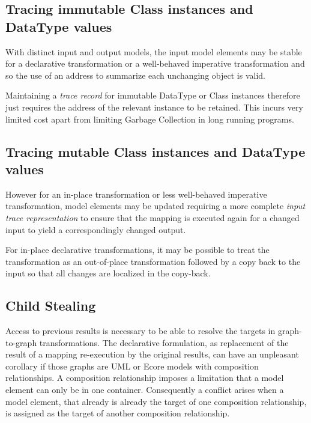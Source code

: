 \documentclass[runningheads,a4paper]{llncs}
\begin{document}
\subsection{Tracing immutable Class instances and DataType values}

With distinct input and output models, the input model elements may be stable for a declarative transformation or a well-behaved imperative transformation and so the use of an address to summarize each unchanging object is valid.

Maintaining a \emph{trace record} for immutable DataType or Class instances therefore just requires the address of the relevant instance to be retained. This incurs very limited cost apart from limiting Garbage Collection in long running programs.


\subsection{Tracing mutable Class instances and DataType values}

However for an in-place transformation or less well-behaved imperative transformation, model elements may be updated requiring a more complete \emph{input trace representation} to ensure that the mapping is executed again for a changed input to yield a correspondingly changed output.

For in-place declarative transformations, it may be possible to treat the transformation as an out-of-place transformation followed by a copy back to the input so that all changes are localized in the copy-back.


\subsection{Child Stealing}

Access to previous results is necessary to be able to resolve the targets in graph-to-graph transformations. The declarative formulation, as replacement of the result of a mapping re-execution by the original results, can have an unpleasant corollary if those graphs are UML or Ecore models with composition relationships. A composition relationship imposes a limitation that a model element can only be in one container. Consequently a conflict arises when a model element, that already is already the target of one composition relationship, is assigned as the target of another composition relationship.
\end{document}
